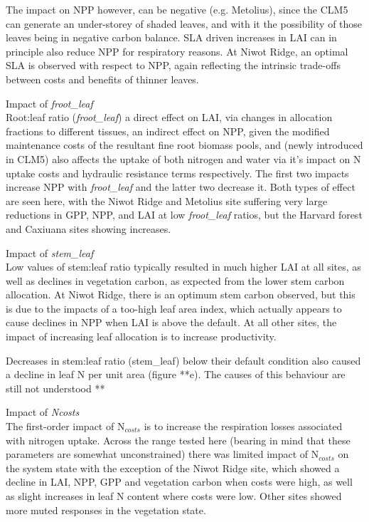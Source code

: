 \documentclass[draft,linenumbers]{agujournal}
\begin{document}
The impact on NPP however, can be negative (e.g. Metolius), since the CLM5 can generate an under-storey of shaded leaves, and with it the possibility of those leaves being in negative carbon balance.  SLA driven increases in LAI can in principle also reduce NPP for respiratory reasons. At Niwot Ridge, an optimal SLA is observed with respect to NPP, again reflecting the intrinsic trade-offs between costs and benefits of thinner leaves. 

Impact of \emph{froot\_leaf}\\
Root:leaf ratio (\emph{froot\_leaf}) a direct effect on LAI, via changes in allocation fractions to different tissues, an indirect effect on NPP, given the modified maintenance costs of the resultant fine root biomass pools, and (newly introduced in CLM5) also affects the uptake of both nitrogen and water via it's impact on N uptake costs and hydraulic resistance terms respectively. The first two impacts increase NPP with \emph{froot\_leaf} and the latter two decrease it.  Both types of effect are seen here, with the Niwot Ridge and Metolius site suffering very large reductions in GPP, NPP, and LAI at low \emph{froot\_leaf} ratios, but the Harvard forest and Caxiuana sites showing increases. 


Impact of \emph{stem\_leaf}\\
Low values of stem:leaf ratio typically resulted in much higher LAI at all sites, as well as declines in vegetation carbon, as expected from the lower stem carbon allocation. At Niwot Ridge, there is an optimum stem carbon observed, but this is due to the impacts of a too-high leaf area index, which actually appears to cause declines in NPP when LAI is above the default. At all other sites, the impact of increasing leaf allocation is to increase productivity. 

Decreases in stem:leaf ratio (stem\_leaf) below their default condition also caused a decline in leaf N per unit area (figure **e).  The causes of this behaviour are still not understood **

Impact of \emph{Ncosts}\\
The first-order impact of N$_{costs}$ is to increase the respiration losses associated with nitrogen uptake.  Across the range tested here (bearing in mind that these parameters are somewhat unconstrained) there was limited impact of N$_{costs}$ on the system state with the exception of the Niwot Ridge site, which showed a decline in LAI, NPP, GPP and vegetation carbon when costs were high, as well as slight increases in leaf N content where costs were low. Other sites showed more muted responses in the vegetation state. 
\end{document}
